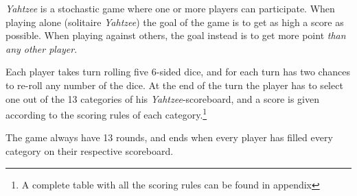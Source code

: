 \emph{Yahtzee} is a stochastic game where one or more players can participate. 
When playing alone (solitaire \emph{Yahtzee}) the goal of the game is to get as high a score as possible. 
When playing against others, the goal instead is to get more point \emph{than any other player}.

Each player takes turn rolling five 6-sided dice, and for each turn has two chances to re-roll any number of the dice. At the end of the turn the player has to select one out of the 13 categories of his \emph{Yahtzee}-scoreboard, and a score is given according to the scoring rules of each category.\footnote{A complete table with all the scoring rules can be found in appendix}%

The game always have 13 rounds, and ends when every player has filled every category on their respective scoreboard.
